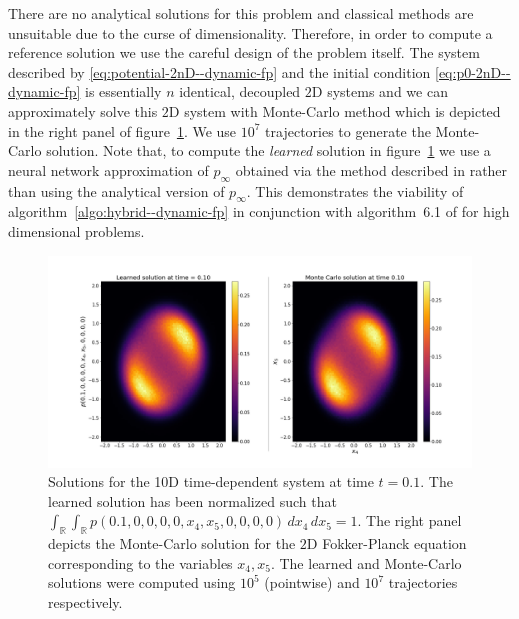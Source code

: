 There are no analytical solutions for this problem and classical methods are unsuitable due to the curse of dimensionality. Therefore, in order to compute a reference solution we use the careful design of the problem itself. The system described by \eqref{eq:potential-2nD--dynamic-fp} and the initial condition \eqref{eq:p0-2nD--dynamic-fp} is essentially $n$ identical, decoupled $2$D systems and we can approximately solve this $2$D system with Monte-Carlo method which is depicted in the right panel of figure~\ref{fig:10D-time--dynamic-fp}. We use $10^7$ trajectories to generate the Monte-Carlo solution. Note that, to compute the \textit{learned} solution in figure~\ref{fig:10D-time--dynamic-fp} we use a neural network approximation of $p_\infty$ obtained via the method described in \cite{mandal2023learning} rather than using the analytical version of $p_\infty$. This demonstrates the viability of algorithm~\ref{algo:hybrid--dynamic-fp} in conjunction with algorithm~6.1 of \cite{mandal2023learning} for high dimensional problems.

\begin{figure}[!ht]
    \centering
\includegraphics[scale=0.32]{dynamic-fp/plots/dynamic-plots-10D-time.png}
    \caption{Solutions for the 10D time-dependent system at time $t=0.1$. The learned solution has been normalized such that $\int_\mathbb{R}\int_\mathbb{R} p(0.1, 0, 0, 0, 0, x_4, x_5, 0, 0, 0, 0)\, dx_4\,dx_5=1$. The right panel depicts the Monte-Carlo solution for the $2$D Fokker-Planck equation corresponding to the variables $x_4,x_5$. The learned and Monte-Carlo solutions were computed using $10^5$ (pointwise) and $10^7$ trajectories respectively.}
    \label{fig:10D-time--dynamic-fp}
\end{figure}

